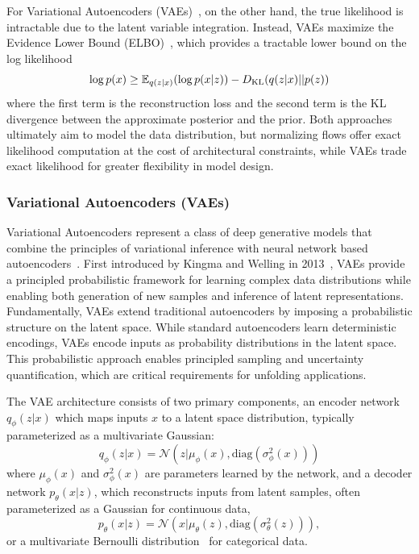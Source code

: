     For Variational Autoencoders (VAEs)~\cite{Kingma2013Auto-EncodingBayes}, on the other hand, the true likelihood is intractable due to the latent variable integration.
    Instead, VAEs maximize the Evidence Lower Bound (ELBO)~\cite{Kingma2019AnAutoencoders}, which provides a tractable lower bound on the log likelihood
    \begin{equation}
    \label{eq:ELBO}
        \log p(x) \geq \mathbb{E}_{q(z|x)}\qty(\log p(x|z)) - D_{\text{KL}}(q(z|x) || p(z))
    \end{equation}
    where the first term is the reconstruction loss and the second term is the KL divergence between the approximate posterior and the prior.
    Both approaches ultimately aim to model the data distribution, but normalizing flows offer exact likelihood computation at the cost of architectural constraints, while VAEs trade exact likelihood for greater flexibility in model design.
    \subsubsection{Variational Autoencoders (VAEs)}
        Variational Autoencoders represent a class of deep generative models that combine the principles of variational inference with neural network based autoencoders~\cite{Bank2023Autoencoders}.
        First introduced by Kingma and Welling in 2013~\cite{Kingma2013Auto-EncodingBayes}, VAEs provide a principled probabilistic framework for learning complex data distributions while enabling both generation of new samples and inference of latent representations.
        Fundamentally, VAEs extend traditional autoencoders by imposing a probabilistic structure on the latent space.
        While standard autoencoders learn deterministic encodings, VAEs encode inputs as probability distributions in the latent space.
        This probabilistic approach enables principled sampling and uncertainty quantification, which are critical requirements for unfolding applications.

        The VAE architecture consists of two primary components, an encoder network \(q_{\phi}(z|x)\) which maps inputs \(x\) to a latent space distribution, typically parameterized as a multivariate Gaussian:
        \begin{equation}
        q_{\phi}(z|x) = \mathcal{N}(z|\mu_{\phi}(x), \text{diag}(\sigma^2_{\phi}(x)))
        \end{equation}
        where \(\mu_{\phi}(x)\) and \(\sigma^2_{\phi}(x)\) are parameters learned by the network, and a  decoder network \(p_{\theta}(x|z)\), which reconstructs inputs from latent samples, often parameterized as a Gaussian for continuous data,
        \begin{equation}
            p_{\theta}(x|z) = \mathcal{N}(x|\mu_{\theta}(z), \text{diag}(\sigma^2_{\theta}(z))),
        \end{equation}
        or a multivariate Bernoulli distribution~\cite{Fajtl2020LatentAutoencoder} for categorical data.

